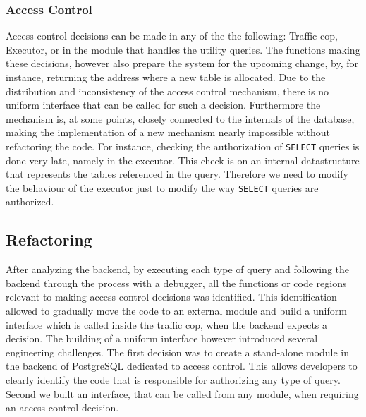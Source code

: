 \subsubsection{Access Control}
%
Access control decisions can be made in any of the the following: Traffic cop, Executor, or in the module that handles the utility queries.
%
The functions making these decisions, however also prepare the system for the upcoming change, by, for instance, returning the address where a new table is allocated.
%
Due to the distribution and inconsistency of the access control mechanism, there is no uniform interface that can be called for such a decision.
%
Furthermore  the mechanism is, at some points, closely connected to the internals of the database, making the implementation of a new mechanism nearly impossible without refactoring the code.
%
For instance, checking the authorization of \texttt{SELECT} queries is done very late, namely in the executor.
%
This check is on an internal datastructure that represents the tables referenced in the query.
%
Therefore we need to modify the behaviour of the executor just to modify the way \texttt{SELECT} queries are authorized.

%
\FloatBarrier

%
\subsection{Refactoring}
%
After analyzing the backend, by executing each type of query and following the backend through the process with a debugger, all the functions or code regions relevant to making access control decisions was identified.
%
This identification allowed to gradually move the code to an external module and build a uniform interface which is called inside the traffic cop, when the backend expects a decision. 
%
The building of a uniform interface however introduced several engineering challenges.
%
The first decision was to create a stand-alone module in the backend of PostgreSQL dedicated to access control.
This allows developers to clearly identify the code that is responsible for authorizing any type of query.
%
Second we built an interface, that can be called from any module, when requiring an access control decision.

